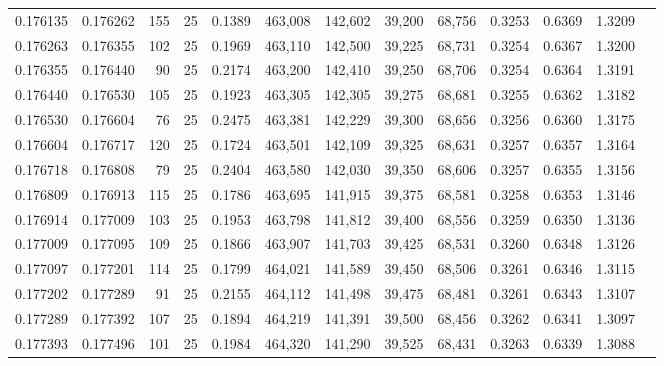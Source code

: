 \begin{tabular}{rrrrrrrrrrrrr}
0.176135 & 0.176262 &   155 &  25 &                                     0.1389 & 463,008 & 142,602 &  39,200 &  68,756 & 0.3253 & 0.6369 & 1.3209 \\
0.176263 & 0.176355 &   102 &  25 &                                     0.1969 & 463,110 & 142,500 &  39,225 &  68,731 & 0.3254 & 0.6367 & 1.3200 \\
0.176355 & 0.176440 &    90 &  25 &                                     0.2174 & 463,200 & 142,410 &  39,250 &  68,706 & 0.3254 & 0.6364 & 1.3191 \\
0.176440 & 0.176530 &   105 &  25 &                                     0.1923 & 463,305 & 142,305 &  39,275 &  68,681 & 0.3255 & 0.6362 & 1.3182 \\
0.176530 & 0.176604 &    76 &  25 &                                     0.2475 & 463,381 & 142,229 &  39,300 &  68,656 & 0.3256 & 0.6360 & 1.3175 \\
0.176604 & 0.176717 &   120 &  25 &                                     0.1724 & 463,501 & 142,109 &  39,325 &  68,631 & 0.3257 & 0.6357 & 1.3164 \\
0.176718 & 0.176808 &    79 &  25 &                                     0.2404 & 463,580 & 142,030 &  39,350 &  68,606 & 0.3257 & 0.6355 & 1.3156 \\
0.176809 & 0.176913 &   115 &  25 &                                     0.1786 & 463,695 & 141,915 &  39,375 &  68,581 & 0.3258 & 0.6353 & 1.3146 \\
0.176914 & 0.177009 &   103 &  25 &                                     0.1953 & 463,798 & 141,812 &  39,400 &  68,556 & 0.3259 & 0.6350 & 1.3136 \\
0.177009 & 0.177095 &   109 &  25 &                                     0.1866 & 463,907 & 141,703 &  39,425 &  68,531 & 0.3260 & 0.6348 & 1.3126 \\
0.177097 & 0.177201 &   114 &  25 &                                     0.1799 & 464,021 & 141,589 &  39,450 &  68,506 & 0.3261 & 0.6346 & 1.3115 \\
0.177202 & 0.177289 &    91 &  25 &                                     0.2155 & 464,112 & 141,498 &  39,475 &  68,481 & 0.3261 & 0.6343 & 1.3107 \\
0.177289 & 0.177392 &   107 &  25 &                                     0.1894 & 464,219 & 141,391 &  39,500 &  68,456 & 0.3262 & 0.6341 & 1.3097 \\
0.177393 & 0.177496 &   101 &  25 &                                     0.1984 & 464,320 & 141,290 &  39,525 &  68,431 & 0.3263 & 0.6339 & 1.3088 \\

\end{tabular}
